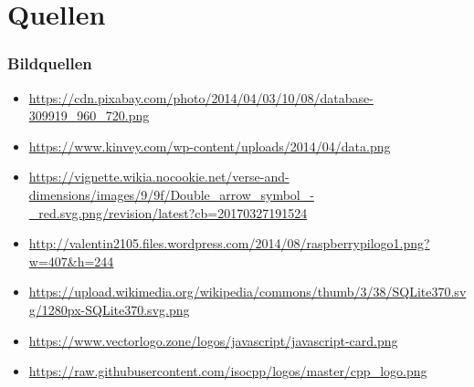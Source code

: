 \section{Quellen}
\begin{frame}
\frametitle{Bildquellen}
    \begin{tiny}
        \begin{itemize}
            \item \url{https://cdn.pixabay.com/photo/2014/04/03/10/08/database-309919_960_720.png}
            \item \url{https://www.kinvey.com/wp-content/uploads/2014/04/data.png}
            \item \url{https://vignette.wikia.nocookie.net/verse-and-dimensions/images/9/9f/Double_arrow_symbol_-_red.svg.png/revision/latest?cb=20170327191524}
            \item \url{http://valentin2105.files.wordpress.com/2014/08/raspberrypilogo1.png?w=407&h=244}
            \item \url{https://upload.wikimedia.org/wikipedia/commons/thumb/3/38/SQLite370.svg/1280px-SQLite370.svg.png}
            \item \url{https://www.vectorlogo.zone/logos/javascript/javascript-card.png}
            \item \url{https://raw.githubusercontent.com/isocpp/logos/master/cpp_logo.png}
        \end{itemize}
    \end{tiny}
\end{frame}